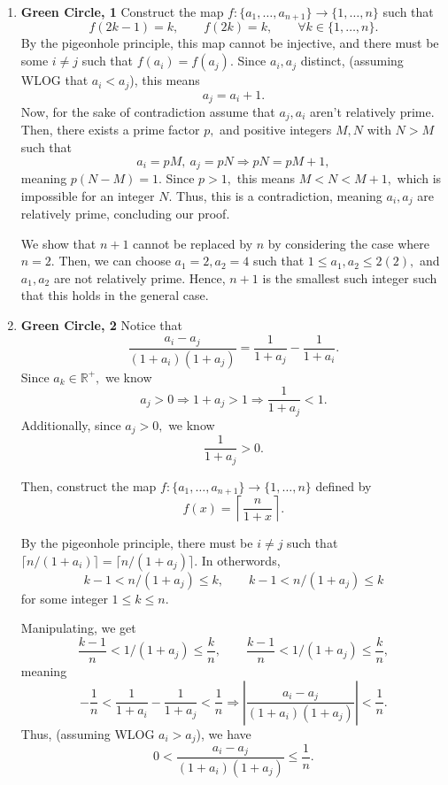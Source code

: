 \documentclass[12pt]{article}
\begin{document}
\begin{enumerate}
  \item \textbf{Green Circle, 1} Construct the map $f: \{a_1, \ldots,
    a_{n + 1}\} \to \{1, \ldots, n\}$ such that
    $$
    f(2k - 1) = k, \qquad f(2k) = k, \qquad \forall k \in \{1, \ldots, n\}.
    $$
    By the pigeonhole principle, this map cannot be injective, and
    there must be some $i \neq j$ such that $f(a_i) = f(a_j).$ Since
    $a_i, a_j$ distinct, (assuming WLOG that $a_i < a_j$), this means
    $$
    a_j = a_i + 1.
    $$
    Now, for the sake of contradiction assume that $a_j, a_i$ aren't
    relatively prime. Then, there exists a prime factor $p,$ and
    positive integers $M, N$ with $N > M$ such that
    $$
    a_i = pM, \ a_j = pN \Rightarrow pN = pM + 1,
    $$
    meaning $p(N - M) = 1.$ Since $p > 1,$ this means $M< N < M + 1,$
    which is impossible for an integer $N.$ Thus, this is a
    contradiction, meaning $a_i, a_j$ are relatively prime,
    concluding our proof.

    We show that $n + 1$ cannot be replaced by $n$ by considering the
    case where $n = 2.$ Then, we can choose $a_1 = 2, a_2 = 4$ such
    that $1 \leq a_1, a_2 \leq 2(2),$ and $a_1, a_2$ are not
    relatively prime. Hence, $n + 1$ is the smallest such integer
    such that this holds in the general case.

  \item \textbf{Green Circle, 2} Notice that
    $$
    \dfrac{a_i - a_j}{(1 +a_i)(1+a_j)} = \dfrac{1}{1+a_j} - \dfrac{1}{1+a_i}.
    $$
    Since $a_k \in \mathbb R^{+},$ we know
    $$
    a_j > 0 \Rightarrow 1 + a_j > 1 \Rightarrow \dfrac{1}{1+a_j} < 1.
    $$
    Additionally, since $a_j > 0,$ we know
    $$
    \dfrac{1}{1+a_j} > 0.
    $$

    Then, construct the map $f: \{a_1, \ldots, a_{n +1}\} \to \{1,
    \ldots, n\}$ defined by
    $$
    f(x) = \left\lceil \dfrac{n}{1+x} \right\rceil.
    $$

    By the pigeonhole principle, there must be $i \neq j$ such that
    $\lceil n/(1 + a_i) \rceil = \lceil n/(1 + a_j) \rceil.$ In otherwords,
    $$
    k - 1< n/(1 + a_j) \leq k, \qquad k - 1< n/(1 + a_j) \leq k
    $$
    for some integer $1 \leq k \leq n.$

    Manipulating, we get
    $$
    \frac{k - 1}{n}< 1/(1 + a_j) \leq \frac{k}{n}, \qquad \frac{k -
    1}{n}< 1/(1 + a_j) \leq \frac{k}{n},
    $$
    meaning
    $$
    -\frac{1}{n}< \dfrac{1}{1+a_i} - \dfrac{1}{1 +a_j} < \frac{1}{n}
    \Rightarrow \left|\dfrac{a_i - a_j}{(1+a_i)(1+a_j)}\right| < \dfrac{1}{n}.
    $$
    Thus, (assuming WLOG $a_i > a_j$), we have
    $$
    0 < \dfrac{a_i - a_j}{(1+a_i)(1+a_j)} \leq \dfrac{1}{n}.
    $$


\end{enumerate}
\end{document}
